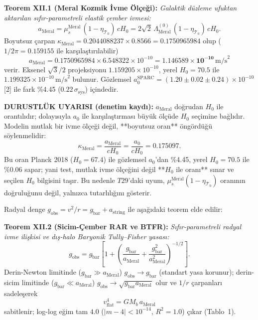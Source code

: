 \documentclass[12pt,a4paper]{article}
\begin{document}
\textbf{Teorem XII.1 (Meral Kozmik İvme Ölçeği):} \textit{Galaktik düzleme
ufuktan aktarılan sıfır-parametreli elastik çember ivmesi:}
\begin{equation}
\label{eq:ameral}
\boxed{a_{\mathrm{Meral}} = \mu_s^{\mathrm{Meral}}\,(1-\eta_{\mathcal{T}_0})\,cH_0
= 2\sqrt{2}\,\Lambda_{\mathrm{Meral}}^{(0)}\,(1-\eta_{\mathcal{T}_0})\,cH_0.}
\end{equation}
Boyutsuz çarpan
$\kappa_{\mathrm{Meral}} = 0.2044088237\times 0.8566 = 0.1750965984$ olup
($1/2\pi = 0.159155$ ile karşılaştırılabilir)
\begin{equation}
a_{\mathrm{Meral}} = 0.1750965984\times 6.548322\times 10^{-10}
= \mathbf{1.146589\times 10^{-10}}\,\mathrm{m/s}^2
\end{equation}
verir. Eksenel $\sqrt{3}/2$ projeksiyonu $1.159205\times 10^{-10}$,
yerel $H_0 = 70.5$ ile $1.199325\times 10^{-10}\,\mathrm{m/s}^2$ bulunur.
Gözlemsel $a_0^{\mathrm{SPARC}} = (1.20\pm 0.02\pm 0.24)\times 10^{-10}$ [2] ile
fark \%4.45 ($0.22\,\sigma_{\mathrm{sys}}$) içindedir.

\textbf{DURUSTLÜK UYARISI (denetim kaydı):} $a_{\mathrm{Meral}}$ doğrudan
$H_0$ ile orantılıdır; dolayısıyla $a_0$ ile karşılaştırması büyük ölçüde
$H_0$ seçimine bağlıdır. Modelin mutlak bir ivme ölçeği değil, **boyutsuz
oran** öngördüğü söylenmelidir:
$$\kappa_{\mathrm{Meral}}=\frac{a_{\mathrm{Meral}}}{cH_0}
=\frac{a_0}{cH_0}=0.175097 .$$
Bu oran Planck 2018 ($H_0=67.4$) ile gözlemsel $a_0$'dan \%4.45, yerel
$H_0=70.5$ ile \%0.06 sapar; yani test, mutlak ivme ölçeğini değil
**$H_0$ ile oranı** sınar ve seçilen $H_0$ bilgisini taşır. Bu nedenle
$T29$'daki uyum, $\mu_s^{\mathrm{Meral}}(1-\eta_{\mathcal{T}_0})$ oranının
doğruluğunu değil, yalnızca tutarlılığını gösterir.

Radyal denge $g_{\mathrm{obs}} = v^2/r = g_{\mathrm{bar}} + a_{\mathrm{string}}$
ile aşağıdaki teorem elde edilir:

\textbf{Teorem XII.2 (Sicim-Çember RAR ve BTFR):} \textit{Sıfır-parametreli
radyal ivme ilişkisi ve dış-halo Baryonik Tully--Fisher yasası:}
\begin{equation}
\label{eq:rar}
\boxed{g_{\mathrm{obs}} = g_{\mathrm{bar}}\left[1+\left(
\frac{g_{\mathrm{bar}}}{a_{\mathrm{Meral}}}
+\frac{g_{\mathrm{bar}}^2}{a_{\mathrm{Meral}}^2}\right)^{-1/2}\right].}
\end{equation}
Derin-Newton limitinde ($g_{\mathrm{bar}}\gg a_{\mathrm{Meral}}$)
$g_{\mathrm{obs}}\to g_{\mathrm{bar}}$ (standart yasa korunur); derin-sicim
limitinde ($g_{\mathrm{bar}}\ll a_{\mathrm{Meral}}$)
$g_{\mathrm{obs}}\to\sqrt{g_{\mathrm{bar}}a_{\mathrm{Meral}}}$ olur ve $1/r$
çarpanları sadeleşerek
\begin{equation}
\boxed{v_{\mathrm{flat}}^4 = GM_b\,a_{\mathrm{Meral}}}
\end{equation}
sabitlenir; log-log eğim tam $4.0$ ($|m-4|<10^{-14}$, $R^2 = 1.0$) çıkar (Tablo~1).
\end{document}
